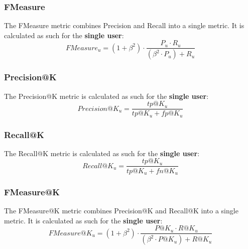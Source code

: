 \subsubsection{FMeasure}\label{subsubsec:f-meas}
The FMeasure metric combines Precision and Recall into a single metric.
It is calculated as such for the \textbf{single user}:
\hfill\break
\hfill\break
    \[
        FMeasure_u = (1 + \beta^2) \cdot \frac{P_u \cdot R_u}{(\beta^2 \cdot P_u) + R_u}
    \]


\subsubsection{Precision@K}\label{subsubsec:prec-k}
The Precision@K metric is calculated as such for the \textbf{single user}:
\hfill\break
\hfill\break
    \[
        Precision@K_u = \frac{tp@K_u}{tp@K_u + fp@K_u}
    \]


\subsubsection{Recall@K}\label{subsubsec:rec-k}
The Recall@K metric is calculated as such for the \textbf{single user}:
\hfill\break
\hfill\break
    \[
        Recall@K_u = \frac{tp@K_u}{tp@K_u + fn@K_u}
    \]


\subsubsection{FMeasure@K}\label{subsubsec:f-meas-k}
The FMeasure@K metric combines Precision@K and Recall@K into a single metric.
It is calculated as such for the \textbf{single user}:
\hfill\break
\hfill\break
    \[
        FMeasure@K_u = (1 + \beta^2) \cdot \frac{P@K_u \cdot R@K_u}{(\beta^2 \cdot P@K_u) + R@K_u}
    \]

